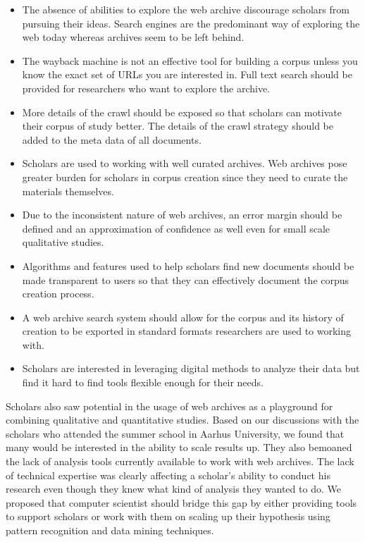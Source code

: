 \begin{itemize}
	\item The absence of abilities to explore the web archive discourage scholars from pursuing their ideas. Search engines are the predominant way of exploring the web today whereas archives seem to be left behind.
	\item The wayback machine is not an effective tool for building a corpus unless you know the exact set of URLs you are interested in. Full text search should be provided for researchers who want to explore the archive.
	\item More details of the crawl should be exposed so that scholars can motivate their corpus of study better. The details of the crawl strategy should be added to the meta data of all documents.
	\item Scholars are used to working with well curated archives. Web archives pose greater burden for scholars in corpus creation since they need to curate the materials themselves.
	\item Due to the inconsistent nature of web archives, an error margin should be defined and an approximation of confidence as well even for small scale qualitative studies.
	\item Algorithms and features used to help scholars find new documents should be made transparent to users so that they can effectively document the corpus creation process.
	\item A web archive search system should allow for the corpus and its history of creation to be exported in standard formats researchers are used to working with. 
	\item Scholars are interested in leveraging digital methods to analyze their data but find it hard to find tools flexible enough for their needs.
\end{itemize}



Scholars also saw potential in the usage of web archives as a playground for combining qualitative and quantitative studies. Based on our discussions with the scholars who attended the summer school in Aarhus University, we found that many would be interested in the ability to scale results up. They also bemoaned the lack of analysis tools currently available to work with web archives. The lack of technical expertise was clearly affecting a scholar's ability to conduct his research even though they knew what kind of analysis they wanted to do. We proposed that computer scientist should bridge this gap by either providing tools to support scholars or work with them on scaling up their hypothesis using pattern recognition and data mining techniques.

